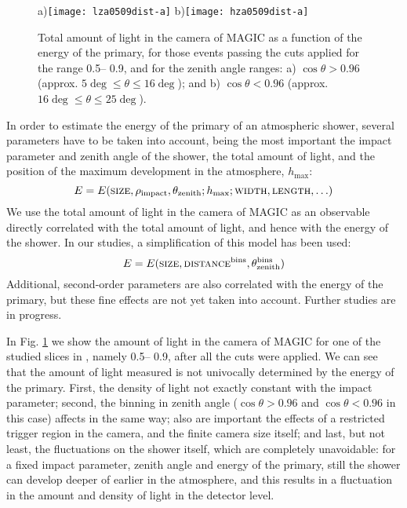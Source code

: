 \begin{figure}[t]
\centering
a)\texttt{[image: lza0509dist-a]}
\hfil
b)\texttt{[image: hza0509dist-a]}
\caption{\label{logSIZElogE:fig}
  Total  amount of light in the  camera of MAGIC  as a function of the
  energy of the primary, for those events passing the cuts applied for
  the \DISTANCE  range 0.5\deg --  0.9\deg,  and for  the zenith angle
  ranges:  a)  $\cos\theta>0.96$ (approx.   $5\deg   \leq  \theta \leq
  16\deg$); and b) $\cos\theta<0.96$ (approx. $16\deg \leq \theta \leq
  25\deg$).}
\vskip -15pt
\end{figure}

In  order  to estimate  the energy of  the  primary  of an atmospheric
shower, several parameters  have to be taken  into  account, being the
most important  the impact parameter  and zenith  angle of the shower,
the total amount of light, and the position of the maximum development
in the atmosphere, $h_{\mathrm{max}}$:
%
\begin{equation}
E = E(\mbox{\scshape size}, \rho_{\mathrm{impact}},
\theta_{\mathrm{zenith}}; h_{\mathrm{max}}; \mbox{\scshape width}, \mbox{\scshape length}, \ldots)
\end{equation}
%
We use  the   total amount of  light   in the camera  of  MAGIC  as an
observable  directly correlated with  the  total amount of light,  and
hence with the energy of the shower. In  our studies, a simplification
of this model has been used:
%
\begin{equation}
E = E(\mbox{\scshape size}, \mbox{\scshape distance}^{\mathrm{bins}},
\theta_{\mathrm{zenith}}^{\mathrm{bins}})
\label{simple.eq}
\end{equation}
%
Additional,  second-order parameters   are also  correlated  with  the
energy of  the primary, but these fine  effects are not yet taken into
account. Further studies are in progress.

In  Fig. \ref{logSIZElogE:fig}  we show the    amount of light  in the
camera of MAGIC for  one  of the studied  slices in  \DISTANCE, namely
0.5\deg -- 0.9\deg, after all the cuts  were applied.  We can see that
the  amount of  light measured  is  not  univocally  determined by the
energy of   the primary. First,  the  density   of light  not  exactly
constant with the  impact   parameter; second, the binning   in zenith
angle ($\cos\theta>0.96$ and  $\cos\theta<0.96$ in this  case) affects
in the  same  way; also  are  important  the effects of  a  restricted
trigger region in  the camera, and the  finite camera size itself; and
last, but not least, the fluctuations on the  shower itself, which are
completely unavoidable: for a fixed impact parameter, zenith angle and
energy of the primary, still the shower can  develop deeper of earlier
in the atmosphere, and this results in a fluctuation in the amount and
density of light in the detector level.

